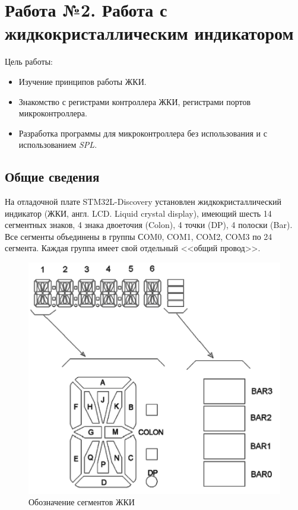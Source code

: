 \chapter{Работа №2. Работа с жидкокристаллическим индикатором}
Цель работы: 
\begin{itemize}
\item Изучение принципов работы ЖКИ.
\item Знакомство с регистрами контроллера ЖКИ, регистрами портов микроконтроллера.
\item Разработка программы для микроконтроллера без использования и с использованием \textit{SPL}.
\end{itemize}

\section{Общие сведения}

На отладочной плате STM32L-Discovery установлен жидкокристаллический индикатор (ЖКИ, англ. LCD. Liquid crystal display), имеющий шесть 14 сегментных знаков, 4 знака двоеточия (Colon), 4 точки (DP), 4 полоски (Bar). Все сегменты объединены в группы СOM0, COM1, COM2, COM3 по 24 сегмента. Каждая группа имеет свой отдельный <<общий провод>>.

\begin{figure}[h!]
\begin{center}
\includegraphics[scale=0.4]{Image/23.jpg}
\end{center}

\caption{Обозначение сегментов ЖКИ}
\end{figure}

